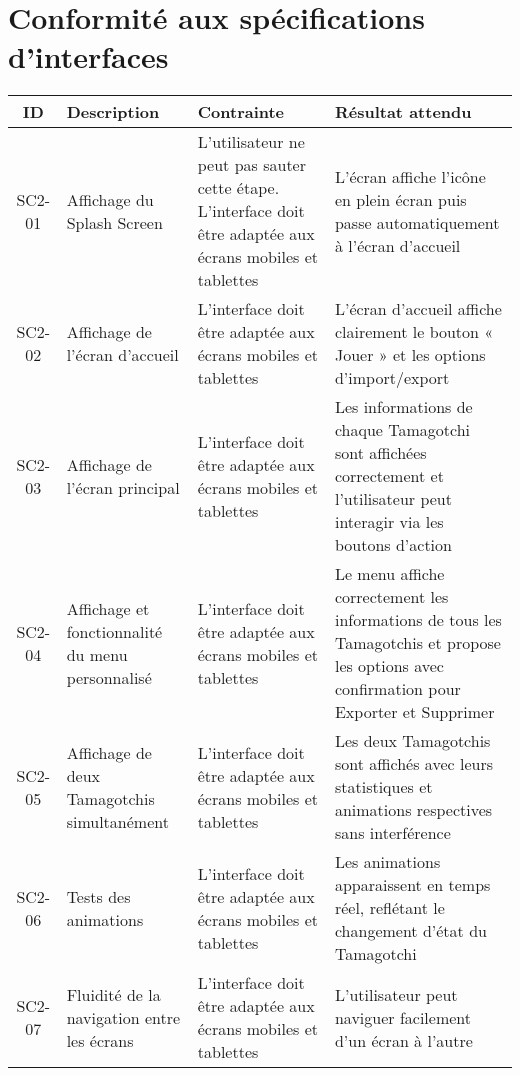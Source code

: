 \documentclass{cahier_de_recette}
\begin{document}
\section{Conformité aux spécifications d’interfaces}

\begin{longtable}{|c|p{4cm}|p{4cm}|p{4cm}|}
\hline
\textbf{ID} & \textbf{Description} & \textbf{Contrainte} & \textbf{Résultat attendu} \\
\hline
SC2-01 & Affichage du Splash Screen & L'utilisateur ne peut pas sauter cette étape. L’interface doit être adaptée aux écrans mobiles et tablettes & L'écran affiche l'icône en plein écran puis passe automatiquement à l'écran d'accueil \\
\hline
SC2-02 & Affichage de l'écran d'accueil & L’interface doit être adaptée aux écrans mobiles et tablettes & L'écran d'accueil affiche clairement le bouton « Jouer » et les options d'import/export \\
\hline
SC2-03 & Affichage de l'écran principal & L’interface doit être adaptée aux écrans mobiles et tablettes & Les informations de chaque Tamagotchi sont affichées correctement et l'utilisateur peut interagir via les boutons d'action \\
\hline
SC2-04 & Affichage et fonctionnalité du menu personnalisé & L’interface doit être adaptée aux écrans mobiles et tablettes & Le menu affiche correctement les informations de tous les Tamagotchis et propose les options avec confirmation pour Exporter et Supprimer \\
\hline
SC2-05 & Affichage de deux Tamagotchis simultanément & L’interface doit être adaptée aux écrans mobiles et tablettes & Les deux Tamagotchis sont affichés avec leurs statistiques et animations respectives sans interférence \\
\hline
SC2-06 & Tests des animations & L’interface doit être adaptée aux écrans mobiles et tablettes & Les animations apparaissent en temps réel, reflétant le changement d'état du Tamagotchi \\
\hline
SC2-07 & Fluidité de la navigation entre les écrans & L’interface doit être adaptée aux écrans mobiles et tablettes & L'utilisateur peut naviguer facilement d'un écran à l'autre \\
\hline
\end{longtable}
\end{document}
